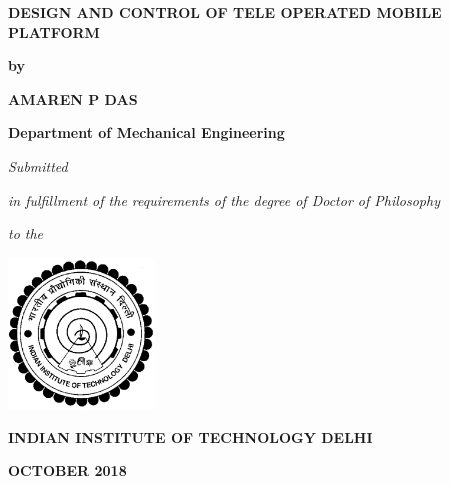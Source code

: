 \newpage
\thispagestyle{empty}
\begin{center}



\textbf{\large{DESIGN AND CONTROL OF TELE OPERATED MOBILE PLATFORM}}

\bigskip
\bigskip
\bigskip
\bigskip
\bigskip
\bigskip
\textbf{by}
\bigskip
\bigskip

\textbf{AMAREN P DAS}

\bigskip
\bigskip

\textbf{Department of Mechanical Engineering}

\bigskip
\bigskip
\bigskip
\bigskip
\bigskip
\bigskip


\textit{Submitted}

\textit{in fulfillment of the requirements of the degree of Doctor of Philosophy}

\bigskip
\bigskip

\textbf{}

\bigskip
\bigskip

\textit{to the}

\bigskip
\bigskip
\bigskip
\bigskip
\bigskip
\bigskip
\bigskip

\includegraphics[height=4cm]{Misc_front/iitlogo.eps}

\bigskip
\bigskip



\textbf{INDIAN INSTITUTE OF TECHNOLOGY DELHI}


\textbf{OCTOBER 2018}
\end{center}
\mbox{}
\restoregeometry